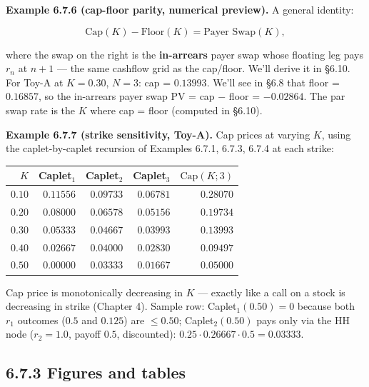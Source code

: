 \documentclass[
  10pt,
  twoside]{book}
\newcounter{none} %
\begin{document}
\textbf{Example 6.7.6 (cap-floor parity, numerical preview).} A general
identity:

\[\text{Cap}(K) - \text{Floor}(K) = \text{Payer Swap}(K),\]

where the swap on the right is the \textbf{in-arrears} payer swap whose
floating leg pays \(r_n\) at \(n+1\) --- the same cashflow grid as the
cap/floor. We'll derive it in §6.10. For Toy-A at \(K = 0.30\),
\(N = 3\): cap = \(0.13993\). We'll see in §6.8 that floor =
\(0.16857\), so the in-arrears payer swap PV = cap \(-\) floor =
\(-0.02864\). The par swap rate is the \(K\) where cap = floor (computed
in §6.10).

\textbf{Example 6.7.7 (strike sensitivity, Toy-A).} Cap prices at
varying \(K\), using the caplet-by-caplet recursion of Examples 6.7.1,
6.7.3, 6.7.4 at each strike:

{\def\LTcaptype{none} %
\begin{table}[H]
\centering
\begin{tabular}{|r|r|r|r|r|}
\toprule
\(K\) & Caplet\(_1\) & Caplet\(_2\) & Caplet\(_3\) &
\(\text{Cap}(K; 3)\) \\
\midrule



\(0.10\) & \(0.11556\) & \(0.09733\) & \(0.06781\) & \(0.28070\) \\
\(0.20\) & \(0.08000\) & \(0.06578\) & \(0.05156\) & \(0.19734\) \\
\(0.30\) & \(0.05333\) & \(0.04667\) & \(0.03993\) & \(0.13993\) \\
\(0.40\) & \(0.02667\) & \(0.04000\) & \(0.02830\) & \(0.09497\) \\
\(0.50\) & \(0.00000\) & \(0.03333\) & \(0.01667\) & \(0.05000\) \\
\bottomrule
\end{tabular}
\end{table}
}

Cap price is monotonically decreasing in \(K\) --- exactly like a call
on a stock is decreasing in strike (Chapter 4). Sample row:
Caplet\(_1(0.50) = 0\) because both \(r_1\) outcomes (\(0.5\) and
\(0.125\)) are \(\leq 0.50\); Caplet\(_2(0.50)\) pays only via the HH
node (\(r_2 = 1.0\), payoff \(0.5\), discounted):
\(0.25 \cdot 0.26667 \cdot 0.5 = 0.03333\).

\subsection{6.7.3 Figures and tables}\label{figures-and-tables-5}
\end{document}
